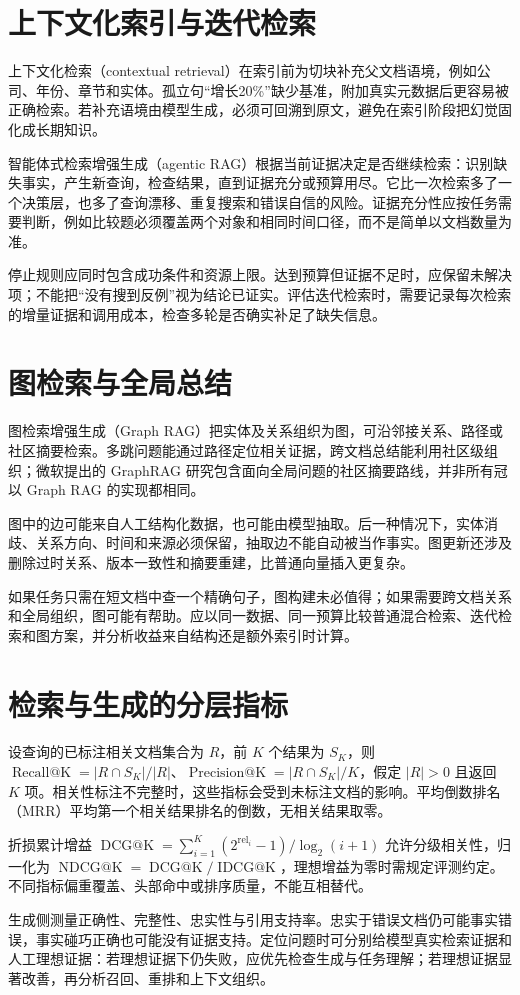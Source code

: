 \section{上下文化索引与迭代检索}

上下文化检索（contextual retrieval）在索引前为切块补充父文档语境，例如公司、年份、章节和实体。孤立句“增长20\%”缺少基准，附加真实元数据后更容易被正确检索。若补充语境由模型生成，必须可回溯到原文，避免在索引阶段把幻觉固化成长期知识\cite{contextual}。

智能体式检索增强生成（agentic RAG）根据当前证据决定是否继续检索：识别缺失事实，产生新查询，检查结果，直到证据充分或预算用尽。它比一次检索多了一个决策层，也多了查询漂移、重复搜索和错误自信的风险。证据充分性应按任务需要判断，例如比较题必须覆盖两个对象和相同时间口径，而不是简单以文档数量为准。

停止规则应同时包含成功条件和资源上限。达到预算但证据不足时，应保留未解决项；不能把“没有搜到反例”视为结论已证实。评估迭代检索时，需要记录每次检索的增量证据和调用成本，检查多轮是否确实补足了缺失信息。

\section{图检索与全局总结}

图检索增强生成（Graph RAG）把实体及关系组织为图，可沿邻接关系、路径或社区摘要检索。多跳问题能通过路径定位相关证据，跨文档总结能利用社区级组织；微软提出的 GraphRAG 研究包含面向全局问题的社区摘要路线\cite{graphrag}，并非所有冠以 Graph RAG 的实现都相同。

图中的边可能来自人工结构化数据，也可能由模型抽取。后一种情况下，实体消歧、关系方向、时间和来源必须保留，抽取边不能自动被当作事实。图更新还涉及删除过时关系、版本一致性和摘要重建，比普通向量插入更复杂。

如果任务只需在短文档中查一个精确句子，图构建未必值得；如果需要跨文档关系和全局组织，图可能有帮助。应以同一数据、同一预算比较普通混合检索、迭代检索和图方案，并分析收益来自结构还是额外索引时计算。

\section{检索与生成的分层指标}

设查询的已标注相关文档集合为 $R$，前 $K$ 个结果为 $S_K$，则 $\operatorname{Recall@K}=|R\cap S_K|/|R|$、$\operatorname{Precision@K}=|R\cap S_K|/K$，假定 $|R|>0$ 且返回 $K$ 项。相关性标注不完整时，这些指标会受到未标注文档的影响。平均倒数排名（MRR）平均第一个相关结果排名的倒数，无相关结果取零。

折损累计增益 $\operatorname{DCG@K}=\sum_{i=1}^K(2^{\mathrm{rel}_i}-1)/\log_2(i+1)$ 允许分级相关性，归一化为 $\operatorname{NDCG@K}=\operatorname{DCG@K}/\operatorname{IDCG@K}$，理想增益为零时需规定评测约定。不同指标偏重覆盖、头部命中或排序质量，不能互相替代。

生成侧测量正确性、完整性、忠实性与引用支持率。忠实于错误文档仍可能事实错误，事实碰巧正确也可能没有证据支持。定位问题时可分别给模型真实检索证据和人工理想证据：若理想证据下仍失败，应优先检查生成与任务理解；若理想证据显著改善，再分析召回、重排和上下文组织。

